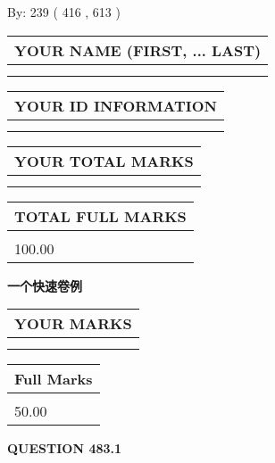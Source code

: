 \documentclass{ctexart}
\begin{document}
   
\hspace{1.0in} By: 
 239 ( 416 ,  613 )
   
   
   
   
\newpage 
\setcounter{page}{ 
   483001 } 
   
   
   
   
\noindent\begin{tabular}{|l|}
\hline
YOUR NAME (FIRST, ... LAST)  \\
\hline
 \\ 
 \\ 
\hline
\end{tabular}
\hspace{0.05in} \begin{tabular}{|l|}
\hline
 YOUR   ID   INFORMATION  \\
\hline
 \\ 
 \\ 
\hline
\end{tabular}
   
   
\vspace{0.2in}\noindent\begin{tabular}{|l|}
\hline
YOUR TOTAL MARKS  \\
\hline
 \\ 
 \\ 
\hline
\end{tabular}
\hspace{0.05in} \begin{tabular}{|l|}
\hline
TOTAL FULL MARKS  \\
\hline
 \\ 
100.00 \\
\hline
\end{tabular}
   
   
 \vspace{0.2in}
{\LARGE {\textbf{ 一个快速卷例}}}
   
   
  
\vspace{0.2in}
  
\noindent\begin{tabular}{|l|}
\hline
 YOUR MARKS  \\
\hline
 \\ 
 \\ 
\hline
\end{tabular}
\hspace{0.05in} \begin{tabular}{|l|}
\hline
 Full Marks  \\
\hline
 \\ 
50.00 \\
\hline
\end{tabular}
{\textbf{\Large{QUESTION
483.1 
}}}
  
\end{document}
